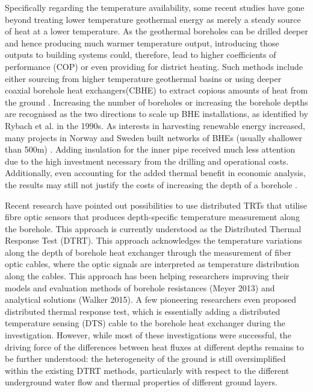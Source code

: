 Specifically regarding the temperature availability, some recent studies have gone beyond treating lower temperature geothermal energy as merely a steady source of heat at a lower temperature. As the geothermal boreholes can be drilled deeper and hence producing much warmer temperature output, introducing those outputs to building systems could, therefore, lead to higher coefficients of performance (COP) or even providing for district heating\cite{prandin_exergy_2010}. Such methods include either sourcing from higher temperature geothermal basins\cite{rybach_borehole_1992} or using deeper coaxial borehole heat exchangers(CBHE) to extract copious amounts of heat from the ground \cite{acuna_experimental_2008}. Increasing the number of boreholes or increasing the borehole depths are recognised as the two directions to scale up BHE installations, as identified by Rybach et al.\cite{ladislaus_rybach_shallow_1995} in the 1990s. As interests in harvesting renewable energy increased, many projects in Norway and Sweden built networks of BHEs (usually shallower than 500m) \cite{holmberg_thermal_2016}. Adding insulation for the inner pipe received much less attention due to the high investment necessary from the drilling and operational costs. Additionally, even accounting for the added thermal benefit in economic analysis, the results may still not justify the costs of increasing the depth of a borehole \cite{dijkshoorn_measurements_2013}.



Recent research have pointed out possibilities to use distributed TRTs that utilise fibre optic sensors that produces depth-specific temperature measurement along the borehole. This approach is currently understood as the  Distributed Thermal Response Test (DTRT). This approach acknowledges the temperature variations along the depth of borehole heat exchanger through the measurement of fiber optic cables, where the optic signals are interpreted as temperature distribution along the cables. This approach has been helping researchers improving their models and evaluation methods of borehole resistances (Meyer 2013) and analytical solutions (Walker 2015). A few pioneering researchers even proposed distributed thermal response test, which is essentially adding a distributed temperature sensing (DTS) cable to the borehole heat exchanger during the investigation. However, while most of these investigations were successful, the driving force of the differences between heat fluxes at different depths remains to be further understood: the heterogeneity of the ground is still oversimplified within the existing DTRT methods, particularly with respect to the different underground water flow and thermal properties of different ground layers. 

